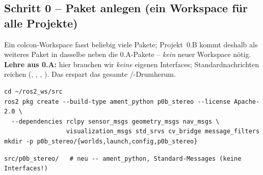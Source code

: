 \subsection{Schritt 0 -- Paket anlegen (ein Workspace für alle Projekte)}
Ein colcon-Workspace fasst beliebig viele Pakete; Projekt~0.B kommt deshalb als
weiteres Paket in dasselbe  neben die 0.A-Pakete --
\emph{kein} neuer Workspace nötig. \textbf{Lehre aus 0.A:} hier brauchen wir
\emph{keine} eigenen Interfaces; Standardnachrichten reichen
(, , ,
). Das erspart das gesamte
/-Drumherum.
\begin{lstlisting}[style=bash,caption={Paket anlegen}]
cd ~/ros2_ws/src
ros2 pkg create --build-type ament_python p0b_stereo --license Apache-2.0 \
  --dependencies rclpy sensor_msgs geometry_msgs nav_msgs \
                 visualization_msgs std_srvs cv_bridge message_filters
mkdir -p p0b_stereo/{worlds,launch,config,p0b_stereo}
\end{lstlisting}
\begin{lstlisting}[style=bash,caption={\code{ros2\_ws}-Delta nach Schritt 0 (\# neu)}]
src/p0b_stereo/   # neu -- ament_python, Standard-Messages (keine Interfaces!)
\end{lstlisting}

